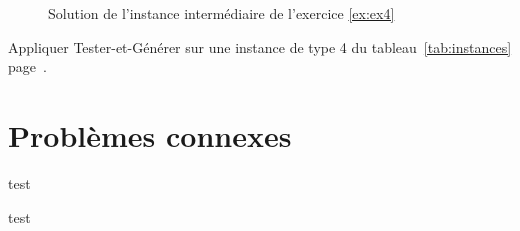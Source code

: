 \documentclass[11pt]{article}
\newcommand{\instance}[1]{instance de type #1 du tableau~\ref{tab:instances} page~\pageref{tab:instances}}
\begin{document}
  \begin{figure}[htbp]
    \centering
    \caption{Solution de l'instance intermédiaire de l'exercice \ref{ex:ex4}}
  \end{figure}

  \begin{exercice}{}
    Appliquer Tester-et-Générer sur une \instance{4}.
  \end{exercice}


  \section{Problèmes connexes}













  \begin{algorithme}{}
    test
  \end{algorithme}


  \begin{plusloin}{}
    test
  \end{plusloin}

  
  
\end{document}
